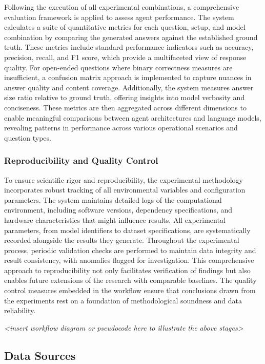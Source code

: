                 Following the execution of all experimental combinations, a comprehensive evaluation framework is applied to assess agent performance. The system calculates a suite of quantitative metrics for each question, setup, and model combination by comparing the generated answers against the established ground truth. These metrics include standard performance indicators such as accuracy, precision, recall, and F1 score, which provide a multifaceted view of response quality. For open-ended questions where binary correctness measures are insufficient, a confusion matrix approach is implemented to capture nuances in answer quality and content coverage. Additionally, the system measures answer size ratio relative to ground truth, offering insights into model verbosity and conciseness. These metrics are then aggregated across different dimensions to enable meaningful comparisons between agent architectures and language models, revealing patterns in performance across various operational scenarios and question types.

            \subsubsection{Reproducibility and Quality Control}

                To ensure scientific rigor and reproducibility, the experimental methodology incorporates robust tracking of all environmental variables and configuration parameters. The system maintains detailed logs of the computational environment, including software versions, dependency specifications, and hardware characteristics that might influence results. All experimental parameters, from model identifiers to dataset specifications, are systematically recorded alongside the results they generate. Throughout the experimental process, periodic validation checks are performed to maintain data integrity and result consistency, with anomalies flagged for investigation. This comprehensive approach to reproducibility not only facilitates verification of findings but also enables future extensions of the research with comparable baselines. The quality control measures embedded in the workflow ensure that conclusions drawn from the experiments rest on a foundation of methodological soundness and data reliability.

            \textit{<insert workflow diagram or pseudocode here to illustrate the above stages>}

        \subsection{Data Sources}

